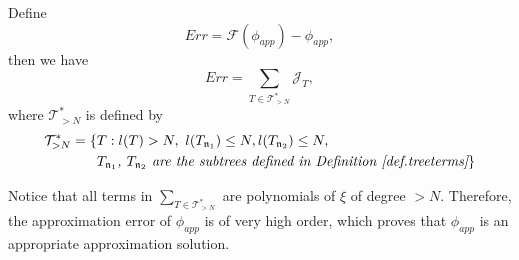 \begin{lem}\label{lem.approxerror} Define 
\begin{equation}
    Err=\mathcal{F}(\phi_{app})-\phi_{app},
\end{equation}
then we have 
\begin{equation}\label{eq.approxerror.threewave}
    Err=\sum_{T\in \mathcal{T}_{>N}^*} \mathcal{J}_T,
\end{equation}
where $\mathcal{T}_{>N}^*$ is defined by
\begin{equation}
\begin{split}
    \mathcal{T}_{>N}^*=\{&T:l(T)>N,\ l(T_{\mathfrak{n}_1})\le N,
    l(T_{\mathfrak{n}_2})\le N,
    \\
    &\textit{$T_{\mathfrak{n}_1}$, $T_{\mathfrak{n}_2}$ are the subtrees defined in Definition \ref{def.treeterms}} \}
\end{split}
\end{equation}
\end{lem}

\begin{rem}
Notice that all terms in $\sum_{T\in \mathcal{T}_{>N}^*}$ are polynomials of $\xi$ of degree $>N$. Therefore, the approximation error of $\phi_{app}$ is of very high order, which proves that $\phi_{app}$ is an appropriate approximation solution. 
\end{rem}

